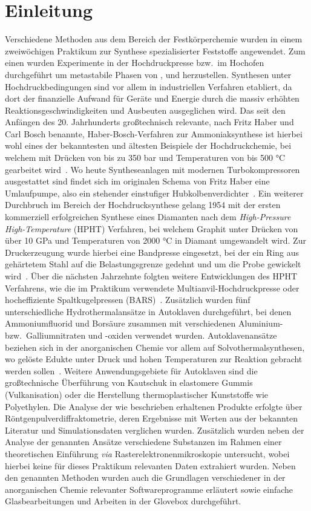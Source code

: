 \documentclass[12pt]{article}
\begin{document}
\section{Einleitung}
Verschiedene Methoden aus dem Bereich der Festkörperchemie wurden in einem zweiwöchigen Praktikum zur Synthese spezialisierter Feststoffe angewendet.
Zum einen wurden Experimente in der Hochdruckpresse bzw.~im Hochofen durchgeführt um metastabile Phasen von ,  und  herzustellen.
Synthesen unter Hochdruckbedingungen sind vor allem in industriellen Verfahren etabliert, da dort der finanzielle Aufwand für Geräte und Energie durch die massiv erhöhten Reaktionsgeschwindigkeiten und Ausbeuten ausgeglichen wird. 
Das seit den Anfängen des 20. Jahrhunderts großtechnisch relevante, nach Fritz Haber und Carl Bosch benannte, Haber-Bosch-Verfahren zur Ammoniaksynthese ist hierbei wohl eines der bekanntesten und ältesten Beispiele der Hochdruckchemie, bei welchem mit Drücken von bis zu 350 bar und Temperaturen von bis 500 \si{\degreeCelsius} gearbeitet wird~\cite{Timm1963}.
Wo heute Syntheseanlagen mit modernen Turbokompressoren ausgestattet sind findet sich im originalen Schema von Fritz Haber eine Umlaufpumpe, also ein stehender einstufiger Hubkolbenverdichter~\cite{deutscheschemiemuseumUmlaufpumpe}.
Ein weiterer Durchbruch im Bereich der Hochdrucksynthese gelang 1954 mit der ersten kommerziell erfolgreichen Synthese eines Diamanten nach dem \textit{High-Pressure High-Temperature} (HPHT) Verfahren, bei welchem Graphit unter Drücken von über 10 GPa und Temperaturen von 2000 \si{\degreeCelsius} in Diamant umgewandelt wird.
Zur Druckerzeugung wurde hierbei eine Bandpresse  eingesetzt, bei der ein Ring aus gehärtetem Stahl auf die Belastungsgrenze gedehnt und um die Probe gewickelt wird~\cite{Hall1960}.
Über die nächsten Jahrzehnte folgten weitere Entwicklungen des HPHT Verfahrens, wie die im Praktikum verwendete Multianvil-Hochdruckpresse oder hocheffiziente Spaltkugelpressen (BARS)~\cite{Abbaschian2005}.
Zusätzlich wurden fünf unterschiedliche Hydrothermalansätze in Autoklaven durchgeführt, bei denen Ammoniumfluorid und Borsäure zusammen mit verschiedenen Aluminium- bzw.~Galliumnitraten und -oxiden verwendet wurden.
Autoklavenansätze beziehen sich in der anorganischen Chemie vor allem auf Solvothermalsynthesen, wo gelöste Edukte unter Druck und hohen Temperaturen zur Reaktion gebracht werden sollen~\cite{Rabenau1985}. Weitere Anwendungsgebiete für Autoklaven sind die großtechnische Überführung von Kautschuk in elastomere Gummis (Vulkanisation) oder die Herstellung thermoplastischer Kunststoffe wie Polyethylen.
Die Analyse der wie beschrieben erhaltenen Produkte erfolgte über Röntgenpulverdiffraktometrie, deren Ergebnisse mit Werten aus der bekannten Literatur und Simulationsdaten verglichen wurden.
Zusätzlich wurden neben der Analyse der genannten Ansätze verschiedene Substanzen im Rahmen einer theoretischen Einführung \textit{via} Rasterelektronenmikroskopie untersucht, wobei hierbei keine für dieses Praktikum relevanten Daten extrahiert wurden.
Neben den genannten Methoden wurden auch die Grundlagen verschiedener in der anorganischen Chemie relevanter Softwareprogramme erläutert sowie einfache Glasbearbeitungen und Arbeiten in der Glovebox durchgeführt.
\end{document}
